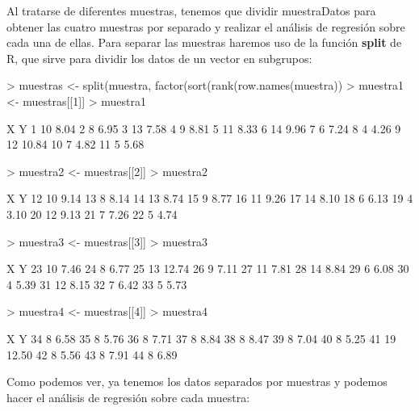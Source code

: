 \documentclass[a4paper]{article}
\begin{document}
Al tratarse de diferentes muestras, tenemos que dividir muestraDatos para obtener las cuatro muestras por separado y realizar el análisis de regresión sobre cada una de ellas. Para separar las muestras haremos uso de la función \textbf{split} de R, que sirve para dividir los datos de un vector en subgrupos:
\begin{Schunk}
\begin{Sinput}
> muestras <- split(muestra, factor(sort(rank(row.names(muestra))%
> muestra1 <- muestras[[1]]
> muestra1
\end{Sinput}
\begin{Soutput}
    X     Y
1  10  8.04
2   8  6.95
3  13  7.58
4   9  8.81
5  11  8.33
6  14  9.96
7   6  7.24
8   4  4.26
9  12 10.84
10  7  4.82
11  5  5.68
\end{Soutput}
\begin{Sinput}
> muestra2 <- muestras[[2]]
> muestra2
\end{Sinput}
\begin{Soutput}
    X    Y
12 10 9.14
13  8 8.14
14 13 8.74
15  9 8.77
16 11 9.26
17 14 8.10
18  6 6.13
19  4 3.10
20 12 9.13
21  7 7.26
22  5 4.74
\end{Soutput}
\begin{Sinput}
> muestra3 <- muestras[[3]]
> muestra3
\end{Sinput}
\begin{Soutput}
    X     Y
23 10  7.46
24  8  6.77
25 13 12.74
26  9  7.11
27 11  7.81
28 14  8.84
29  6  6.08
30  4  5.39
31 12  8.15
32  7  6.42
33  5  5.73
\end{Soutput}
\begin{Sinput}
> muestra4 <- muestras[[4]]
> muestra4
\end{Sinput}
\begin{Soutput}
    X     Y
34  8  6.58
35  8  5.76
36  8  7.71
37  8  8.84
38  8  8.47
39  8  7.04
40  8  5.25
41 19 12.50
42  8  5.56
43  8  7.91
44  8  6.89
\end{Soutput}
\end{Schunk}

Como podemos ver, ya tenemos los datos separados por muestras y podemos hacer el análisis de regresión sobre cada muestra:
\end{document}
